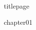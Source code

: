 \documentclass[
	,a4paper
	,12pt
	,oneside
]{book}
\begin{document}
\frontmatter

	{titlepage}
	\tableofcontents

\mainmatter

{chapter01}

\backmatter
\end{document}
